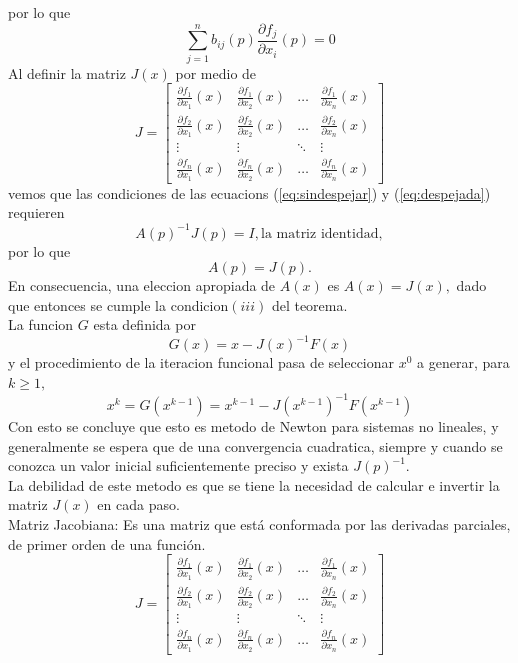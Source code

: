 ﻿\documentclass[11pt]{article}
\begin{document}
por lo que 
\begin{equation}
\sum_{j=1}^{n}b_{ij}(p){\frac{\partial f_{j}}{\partial x_{i}}(p)}=0
\label{eq:despejada}
\end{equation}
Al definir la matriz $J(x)$ por medio de
\begin{equation}
J=
\begin{bmatrix}
    \frac{\partial f_1}{\partial x_1}(x)       & \frac{\partial f_1}{\partial x_2}(x)       & \dots & \frac{\partial f_1}{\partial x_n}(x)       \\
    \frac{\partial f_2}{\partial x_1}(x)             & \frac{\partial f_2}{\partial x_2}(x)       & \dots & \frac{\partial f_2}{\partial x_n}(x)       \\
    \vdots & \vdots & \ddots  & \vdots\\
    \frac{\partial f_n}{\partial x_1}(x)             & \frac{\partial f_n}{\partial x_2}(x)       & \dots & \frac{\partial f_n}{\partial x_n}(x)      
    \label{matrix:J}    
\end{bmatrix}
\end{equation}
vemos que las condiciones de las ecuacions (\ref{eq:sindespejar}) y (\ref{eq:despejada}) 
requieren $$A(p)^{-1}J(p)=I, \textrm{la matriz identidad},$$por lo que $$A(p)=J(p).$$
En consecuencia, una eleccion apropiada de $A(x)$ es $A(x)=J(x),$ dado que entonces se cumple la condicion$(iii)$ del teorema.\\
La funcion $G$ esta definida por $$G(x)=x-{J(x)}^{-1}F(x)$$
y el procedimiento de la iteracion funcional pasa de seleccionar $x^0$ a generar, para $k\geq 1,$ $$x^k=G(x^{k-1})=x^{k-1}-{J(x^{k-1})}^{-1}F(x^{k-1})$$
Con esto se concluye que esto es metodo de Newton para sistemas no lineales, y generalmente se espera que de una convergencia cuadratica, siempre y cuando se conozca un valor inicial suficientemente preciso y exista ${J(p)}^{-1}$.\\
La debilidad de este metodo es que se tiene la necesidad de calcular e invertir la matriz $J(x)$ en cada paso.\\
Matriz Jacobiana: Es una matriz que está conformada por las derivadas parciales, de primer orden de una función.
$$
J=
\begin{bmatrix}
    \frac{\partial f_1}{\partial x_1}(x)       & \frac{\partial f_1}{\partial x_2}(x)       & \dots & \frac{\partial f_1}{\partial x_n}(x)       \\
    \frac{\partial f_2}{\partial x_1}(x)             & \frac{\partial f_2}{\partial x_2}(x)       & \dots & \frac{\partial f_2}{\partial x_n}(x)       \\
    \vdots & \vdots & \ddots  & \vdots\\
    \frac{\partial f_n}{\partial x_1}(x)             & \frac{\partial f_n}{\partial x_2}(x)       & \dots & \frac{\partial f_n}{\partial x_n}(x)         
\end{bmatrix}
$$
\end{document}
